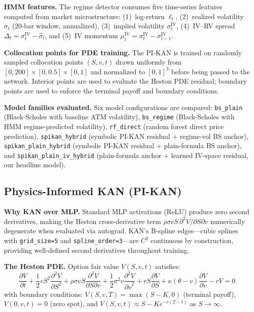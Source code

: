 \documentclass[11pt,a4paper]{article}
\begin{document}
\textbf{HMM features.} The regime detector consumes five time-series features computed
from market microstructure: (1)~log-return $\ell_t$, (2)~realized volatility
$\hat{\sigma}_t$ (20-bar window, annualized), (3)~implied volatility $\sigma^\text{IV}_t$,
(4)~IV--RV spread $\Delta_t = \sigma^\text{IV}_t - \hat{\sigma}_t$, and (5)~IV momentum
$\mu^\text{IV}_t = \sigma^\text{IV}_t - \sigma^\text{IV}_{t-1}$.

\textbf{Collocation points for PDE training.} The PI-KAN is trained on randomly sampled
collocation points $(S, v, t)$ drawn uniformly from $[0,200]\times[0,0.5]\times[0,1]$
and normalized to $[0,1]^3$ before being passed to the network. Interior points are used
to evaluate the Heston PDE residual; boundary points are used to enforce the terminal
payoff and boundary conditions.

\textbf{Model families evaluated.} Six model configurations are compared:
\texttt{bs\_plain} (Black-Scholes with baseline ATM volatility),
\texttt{bs\_regime} (Black-Scholes with HMM regime-predicted volatility),
\texttt{rf\_direct} (random forest direct price prediction),
\texttt{spikan\_hybrid} (symbolic PI-KAN residual + regime-vol BS anchor),
\texttt{spikan\_plain\_hybrid} (symbolic PI-KAN residual + plain-formula BS anchor), and
\texttt{spikan\_plain\_iv\_hybrid} (plain-formula anchor + learned IV-space residual,
our headline model).

\subsection{Physics-Informed KAN (PI-KAN)}

\textbf{Why KAN over MLP.} Standard MLP activations (ReLU) produce zero second
derivatives, making the Heston cross-derivative term $\rho\sigma vS\,\partial^2 V/\partial S\partial v$
numerically degenerate when evaluated via autograd. KAN's B-spline edges---cubic splines
with \texttt{grid\_size=5} and \texttt{spline\_order=3}---are $C^2$ continuous by
construction, providing well-defined second derivatives throughout training.

\textbf{The Heston PDE.} Option fair value $V(S,v,t)$ satisfies:
\begin{equation}
\frac{\partial V}{\partial t}
+ \frac{1}{2}vS^2\frac{\partial^2 V}{\partial S^2}
+ \rho\sigma vS\frac{\partial^2 V}{\partial S\partial v}
+ \frac{1}{2}\sigma^2 v\frac{\partial^2 V}{{\partial v}^2}
+ rS\frac{\partial V}{\partial S}
+ \kappa(\theta-v)\frac{\partial V}{\partial v}
- rV = 0
\label{eq:heston_pde}
\end{equation}
with boundary conditions: $V(S,v,T)=\max(S-K,0)$ (terminal payoff), $V(0,v,t)=0$
(zero spot), and $V(S,v,t)\approx S - Ke^{-r(T-t)}$ as $S\to\infty$.
\end{document}
